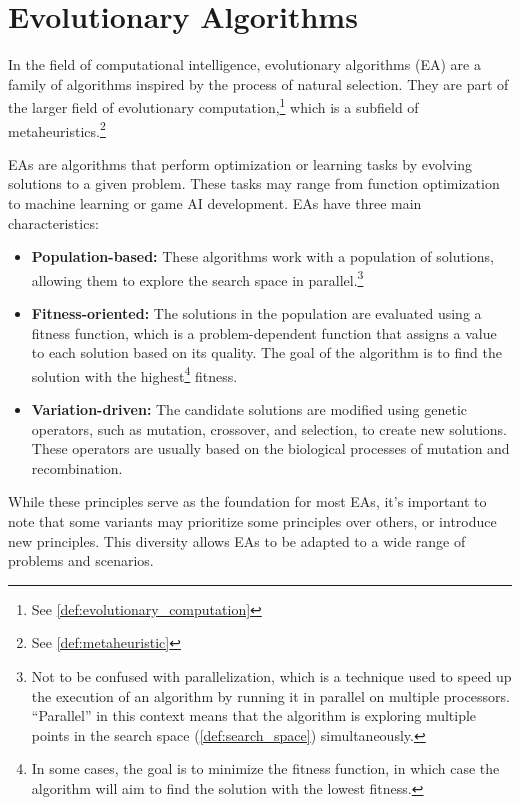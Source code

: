 \section{Evolutionary Algorithms}
\label{sec:evolutionary_algorithms}
  In the field of computational intelligence, evolutionary algorithms (EA) 
  \autocite{yuIntroductionEvolutionaryAlgorithms2010} are a family of algorithms inspired by the 
  process of natural selection.
  They are part of the larger field of evolutionary 
  computation,\footnote{See \vref{def:evolutionary_computation}} which is a subfield of 
  metaheuristics.\footnote{See \vref{def:metaheuristic}}

  EAs are algorithms that perform optimization or learning tasks by evolving solutions to a given
  problem. These tasks may range from function optimization to machine learning or game AI development.
  EAs have three main characteristics:

  \begin{itemize}
    \item \textbf{Population-based:} These algorithms work with a population of solutions, allowing
      them to explore the search space in parallel.\footnote{
        Not to be confused with parallelization, which is a technique used to speed up the execution
        of an algorithm by running it in parallel on multiple processors.
        \enquote{Parallel} in this context means that the algorithm is exploring multiple points in
        the search space (\vref{def:search_space}) simultaneously.
      }
    \item \textbf{Fitness-oriented:} The solutions in the population are evaluated using a fitness
      function, which is a problem-dependent function that assigns a value to each solution based on its quality.
      The goal of the algorithm is to find the solution with the highest\footnote{
        In some cases, the goal is to minimize the fitness function, in which case the algorithm
        will aim to find the solution with the lowest fitness.
      } fitness.
    \item \textbf{Variation-driven:} The candidate solutions are modified using genetic operators,
      such as mutation, crossover, and selection, to create new solutions.
      These operators are usually based on the biological processes of mutation and recombination.
  \end{itemize}
  
  While these principles serve as the foundation for most EAs, it's important to note that some 
  variants may prioritize some principles over others, or introduce new principles. 
  This diversity allows EAs to be adapted to a wide range of problems and scenarios.
